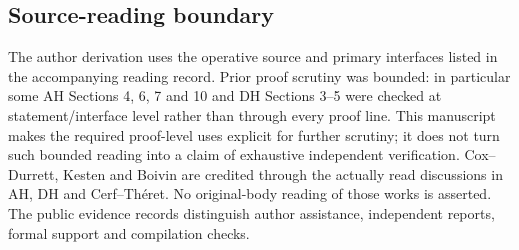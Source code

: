 \subsection{Source-reading boundary}
The author derivation uses the operative source and primary interfaces listed
in the accompanying reading record. Prior proof scrutiny was bounded: in
particular some AH Sections 4, 6, 7 and 10 and DH Sections 3--5 were checked
at statement/interface level rather than through every proof line. This
manuscript makes the required proof-level uses explicit for further scrutiny;
it does not turn such bounded reading into a claim of exhaustive independent
verification. Cox--Durrett, Kesten and Boivin are credited through the actually
read discussions in AH, DH and Cerf--Th\'eret. No original-body reading of
those works is asserted. The public evidence records distinguish author
assistance, independent reports, formal support and compilation checks.
